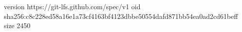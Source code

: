 version https://git-lfs.github.com/spec/v1
oid sha256:c8c228ed58a16e1a73cf4163bf4123dbbe50554dafd871bb54ea0ad2cd61beff
size 2450
